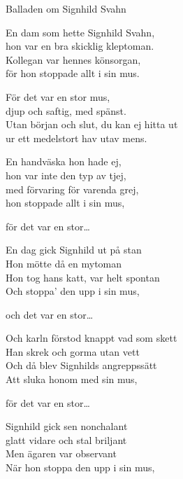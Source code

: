 \begin{song}{Balladen om Signhild Svahn}

	
	
	\showversenumber	
	En dam som hette Signhild Svahn,\\
	hon var en bra skicklig kleptoman.\\
	Kollegan var hennes könsorgan,\\
	för hon stoppade allt i sin mus.
	
	\vspace{-.1cm}
	För det var en stor mus,\\
	djup och saftig, med spänst.\\
	Utan början och slut, du kan ej hitta ut\\
	ur ett medelstort hav utav mens.
	
	\showversenumber
	En handväska hon hade ej,\\
	hon var inte den typ av tjej,\\
	med förvaring för varenda grej,\\
	hon stoppade allt i sin mus,
	
	\vspace{-.1cm}
	för det var en stor\ldots{}

	\showversenumber
	En dag gick Signhild ut på stan\\
	Hon mötte då en mytoman\\
	Hon tog hans katt, var helt spontan\\
	Och stoppa’ den upp i sin mus,
	
	\vspace{-.1cm}
	och det var en stor\ldots{}
	
	\showversenumber
	Och karln förstod knappt vad som skett\\
	Han skrek och gorma utan vett\\
	Och då blev Signhilds angreppssätt\\
	Att sluka honom med sin mus,
	
	\vspace{-.1cm}
	för det var en stor\ldots{}

	\showversenumber
	Signhild gick sen nonchalant\\
	glatt vidare och stal briljant\\
	Men ägaren var observant\\
	När hon stoppa den upp i sin mus,
	

\end{song}
